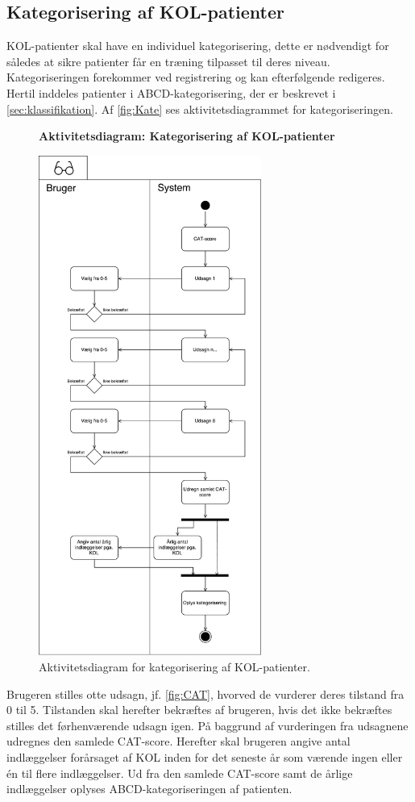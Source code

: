 \subsection*{Kategorisering af KOL-patienter} \label{sec:kategorisering}
KOL-patienter skal have en individuel kategorisering, dette er nødvendigt for således at sikre patienter får en træning tilpasset til deres niveau. Kategoriseringen forekommer ved registrering og kan efterfølgende redigeres.
Hertil inddeles patienter i ABCD-kategorisering, der er beskrevet i \autoref{sec:klassifikation}. Af \autoref{fig:Kate} ses aktivitetsdiagrammet for kategoriseringen.

\begin{figure} [H]
\centering
\textbf{Aktivitetsdiagram: Kategorisering af KOL-patienter}\par\medskip
\includegraphics[width=0.65\textwidth]{figures/aktivitetsdiagram/Kategorisering}
\caption{Aktivitetsdiagram for kategorisering af KOL-patienter.}
\label{fig:Kate}
\end{figure}

\noindent
Brugeren stilles otte udsagn, jf. \autoref{fig:CAT}, hvorved de vurderer deres tilstand fra 0 til 5. Tilstanden skal herefter bekræftes af brugeren, hvis det ikke bekræftes stilles det førhenværende udsagn igen. På baggrund af vurderingen fra udsagnene udregnes den samlede CAT-score. Herefter skal brugeren angive antal indlæggelser forårsaget af KOL inden for det seneste år som værende ingen eller én til flere indlæggelser. Ud fra den samlede CAT-score samt de årlige indlæggelser oplyses ABCD-kategoriseringen af patienten. 